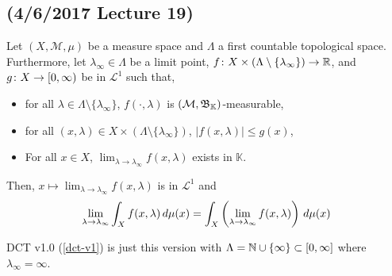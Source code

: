 \documentclass[11pt,leqno,oneside]{amsbook}
\numberwithin{thm}{section}
\newcommand{\M}{\mathcal{M}} %
\newcommand{\cL}{\mathcal{L}}
\newcommand{\K}{\mathbb{K}} %
\begin{document}
\subsection*{(4/6/2017 Lecture 19)}
\begin{thm}
  Let \((X,\M,\mu)\) be a measure space and \(\Lambda\) a first
  countable topological space. Furthermore, let \(\lambda_\infty \in
  \Lambda\) be a limit point, \(f \colon X \times (\Lambda
  \setminus \{\lambda_\infty\}) \to {\mathbb R}\), and \(g \colon X \to
  [0,\infty)\) be in \(\cL^1\) such that,
  \begin{itemize}
  \item for all \(\lambda \in
  \Lambda \setminus \{\lambda_\infty\}\), \(f(\cdot, \lambda)\) is
  \((\M,\B_\K)\)-measurable,
  \item for all \((x,\lambda) \in X \times
  (\Lambda \setminus \{\lambda_\infty\})\), \(|f(x,\lambda)| \leq
  g(x)\),
  \item For all \(x \in X\), \(\lim_{\lambda \to \lambda_\infty}
    f(x,\lambda)\) exists in \(\K\).
  \end{itemize}
  Then, \(x \mapsto \lim_{\lambda \to \lambda_\infty} f(x,\lambda)\)
  is in \(\cL^1\) and \[
    \lim_{\lambda \to \lambda_\infty} \int_X f(x,\lambda) \, d \mu(x) =
    \int_X \left( \lim_{\lambda \to \lambda_\infty} f(x,\lambda)
    \right) \, d \mu(x)
  \]
\end{thm}
\begin{rmk}
  DCT v1.0 (\ref{dct-v1}) is just this version with \(\Lambda = {\mathbb N} \cup \{\infty\}
  \subset [0,\infty]\) where \(\lambda_\infty = \infty\).
\end{rmk}
\end{document}
